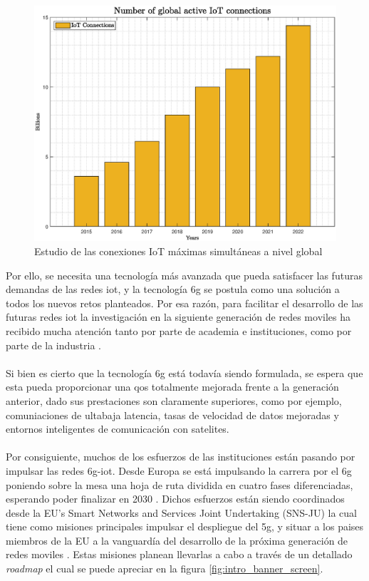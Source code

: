 \begin{figure}[ht]
    \centering
    \includegraphics[width=\textwidth]{archivos/img/intro/fig_iot.eps}
    \caption{Estudio de las conexiones IoT máximas simultáneas a nivel global \cite{figuraIoTDevices}}
    \label{fig:intro_fig_iot}
\end{figure}

Por ello, se necesita una tecnología más avanzada que pueda satisfacer las futuras demandas de las redes \gls{iot}, y la tecnología \gls{6g} se postula como una solución a todos los nuevos retos planteados. Por esa razón, para facilitar el desarrollo de las futuras redes \gls{iot} la investigación en la siguiente generación de redes moviles ha recibido mucha atención tanto por parte de academia e instituciones, como por parte de la industria \cite{Nguyen2022}. \\
\\
Si bien es cierto que la tecnología \gls{6g} está todavía siendo formulada, se espera que esta pueda proporcionar una \gls{qos} totalmente mejorada frente a la generación anterior, dado sus prestaciones son claramente superiores, como por ejemplo, comuniaciones de ultabaja latencia, tasas de velocidad de datos mejoradas y entornos inteligentes de comunicación con satelites. \\
\\
Por consiguiente, muchos de los esfuerzos de las instituciones están pasando por impulsar las redes \gls{6g}-\gls{iot}. Desde Europa se está impulsando la carrera por el \gls{6g} poniendo sobre la mesa una hoja de ruta dividida en cuatro fases diferenciadas, esperando poder finalizar en 2030 \cite{eu6GFases}. Dichos esfuerzos están siendo coordinados desde la EU’s Smart Networks and Services Joint Undertaking (SNS-JU) la cual tiene como misiones principales impulsar el despliegue del \gls{5g}, y situar a los paises miembros de la EU a la vanguardía del desarrollo de la próxima generación de redes moviles \cite{eu6gSNS}. Estas misiones planean llevarlas a cabo a través de un detallado \textit{roadmap} el cual se puede apreciar en la figura \ref{fig:intro_banner_screen}.

